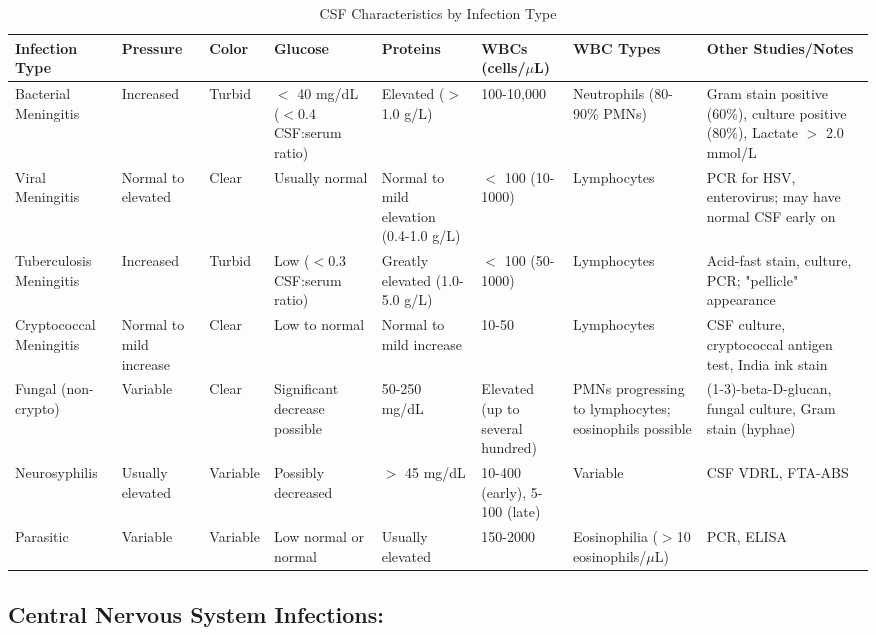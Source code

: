 	\begin{table}[ht]
		\centering
		\caption{CSF Characteristics by Infection Type}
		\begin{tabular}{|l|l|l|l|l|l|l|l|}
			\hline
			\textbf{Infection Type} & \textbf{Pressure} & \textbf{Color} & \textbf{Glucose} & \textbf{Proteins} & \textbf{WBCs (cells/$\mu$L)} & \textbf{WBC Types} & \textbf{Other Studies/Notes} \\
			\hline
			Bacterial Meningitis & Increased & Turbid & $<$ 40 mg/dL ($<$0.4 CSF:serum ratio) & Elevated ($>$1.0 g/L) & 100-10,000 & Neutrophils (80-90\% PMNs) & Gram stain positive (60\%), culture positive (80\%), Lactate $>$ 2.0 mmol/L \\
			Viral Meningitis & Normal to elevated & Clear & Usually normal & Normal to mild elevation (0.4-1.0 g/L) & $<$ 100 (10-1000) & Lymphocytes & PCR for HSV, enterovirus; may have normal CSF early on \\
			Tuberculosis Meningitis & Increased & Turbid & Low ($<$0.3 CSF:serum ratio) & Greatly elevated (1.0-5.0 g/L) & $<$ 100 (50-1000) & Lymphocytes & Acid-fast stain, culture, PCR; "pellicle" appearance \\
			Cryptococcal Meningitis & Normal to mild increase & Clear & Low to normal & Normal to mild increase & 10-50 & Lymphocytes & CSF culture, cryptococcal antigen test, India ink stain \\
			Fungal (non-crypto) & Variable & Clear & Significant decrease possible & 50-250 mg/dL & Elevated (up to several hundred) & PMNs progressing to lymphocytes; eosinophils possible & (1-3)-beta-D-glucan, fungal culture, Gram stain (hyphae) \\
			Neurosyphilis & Usually elevated & Variable & Possibly decreased & $>$ 45 mg/dL & 10-400 (early), 5-100 (late) & Variable & CSF VDRL, FTA-ABS \\
			Parasitic & Variable & Variable & Low normal or normal & Usually elevated & 150-2000 & Eosinophilia ($>$10 eosinophils/$\mu$L) & PCR, ELISA \\
			\hline
		\end{tabular}
	\end{table}
	
	\subsection*{Central Nervous System Infections:}
	
